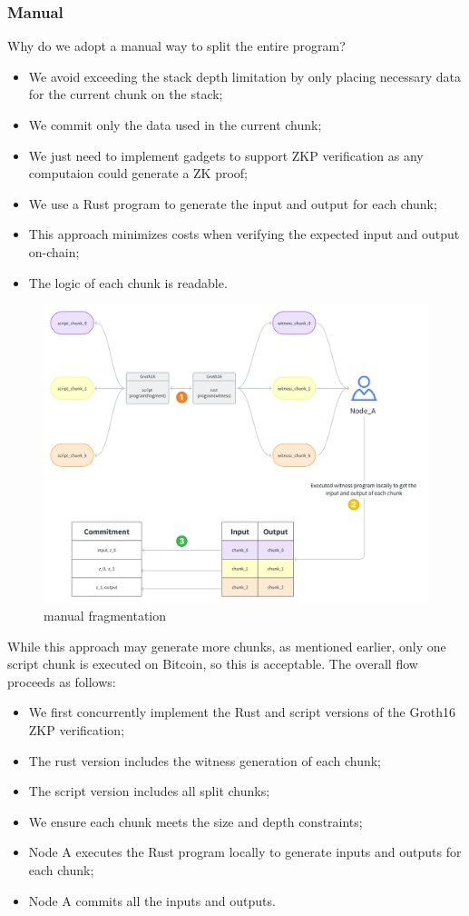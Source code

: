 \subsubsection{Manual}

Why do we adopt a manual way to split the entire program?

\begin{itemize}
    \item We avoid exceeding the stack depth limitation by only placing necessary data for the current chunk on the stack;
    \item We commit only the data used in the current chunk;
    \item We just need to implement gadgets to support ZKP verification as any computaion could generate a ZK proof;
    \item We use a Rust program to generate the input and output for each chunk;
    \item This approach minimizes costs when verifying the expected input and output on-chain;
    \item The logic of each chunk is readable.
\end{itemize}

\begin{figure}[ht] 
    \centering  
    \includegraphics[width=0.65\columnwidth]{images/manually-fragment.png} 
    \caption{manual fragmentation}
    \label{fig:manually-fragment}
\end{figure}

While this approach may generate more chunks, as mentioned earlier, only one script chunk is executed on Bitcoin, so this is acceptable. The overall flow proceeds as follows:
\begin{itemize}
    \item We first concurrently implement the Rust and script versions of the Groth16 ZKP verification;
    \item The rust version includes the witness generation of each chunk;
    \item The script version includes all split chunks;
    \item We ensure each chunk meets the size and depth constraints;
    \item Node A executes the Rust program locally to generate inputs and outputs for each chunk;
    \item Node A commits all the inputs and outputs.
\end{itemize}
